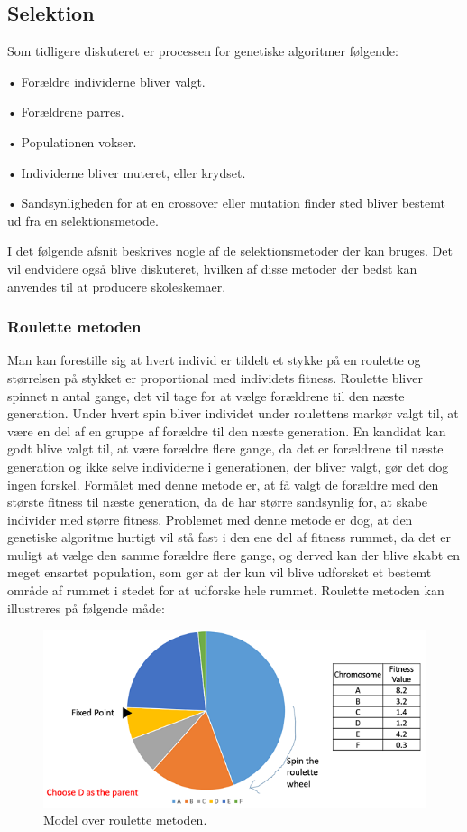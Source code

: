\subsection{Selektion}
Som tidligere diskuteret er processen for genetiske algoritmer følgende:

•	Forældre individerne bliver valgt.


•	Forældrene parres.


•	Populationen vokser.


•	Individerne bliver muteret, eller krydset.


•	Sandsynligheden for at en crossover eller mutation finder sted bliver bestemt ud fra en selektionsmetode.


I det følgende afsnit beskrives nogle af de selektionsmetoder der kan bruges. Det vil endvidere også blive diskuteret, hvilken af disse metoder der bedst kan anvendes til at producere skoleskemaer.

\subsubsection{Roulette metoden}

Man kan forestille sig at hvert individ er tildelt et stykke på en roulette og størrelsen på stykket er proportional med individets fitness. Roulette bliver spinnet n antal gange, det vil tage for at vælge forældrene til den næste generation. Under hvert spin bliver individet under roulettens markør valgt til, at være en del af en gruppe af forældre til den næste generation. En kandidat kan godt blive valgt til, at være forældre flere gange, da det er forældrene til næste generation og ikke selve individerne i generationen, der bliver valgt, gør det dog ingen forskel. Formålet med denne metode er, at få valgt de forældre med den største fitness til næste generation, da de har større sandsynlig for, at skabe individer med større fitness. Problemet med denne metode er dog, at den genetiske algoritme hurtigt vil stå fast i den ene del af fitness rummet, da det er muligt at vælge den samme forældre flere gange, og derved kan der blive skabt en meget ensartet population, som gør at der kun vil blive udforsket et bestemt område af rummet i stedet for at udforske hele rummet.
Roulette metoden kan illustreres på følgende måde:
\begin{figure}[!h]
  \centering
  \includegraphics[width=\textwidth]{partials/graphics/roulette.png}
  \caption{Model over roulette metoden.}
  \label{fig:roulette}
\end{figure}

